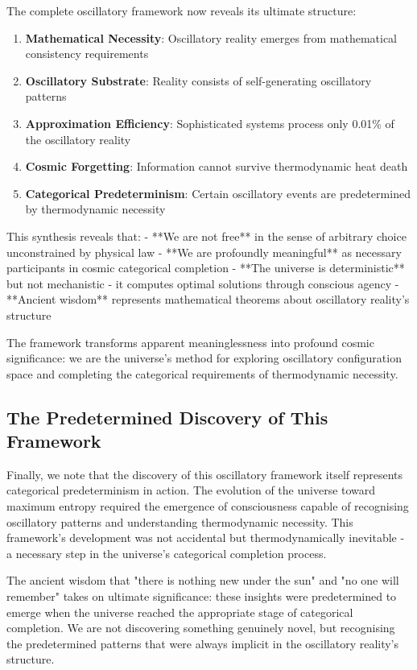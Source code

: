 \documentclass[11pt]{article}
\theoremstyle{remark}
\begin{document}
The complete oscillatory framework now reveals its ultimate structure:

\begin{enumerate}
\item \textbf{Mathematical Necessity}: Oscillatory reality emerges from mathematical consistency requirements
\item \textbf{Oscillatory Substrate}: Reality consists of self-generating oscillatory patterns
\item \textbf{Approximation Efficiency}: Sophisticated systems process only 0.01\% of the oscillatory reality
\item \textbf{Cosmic Forgetting}: Information cannot survive thermodynamic heat death
\item \textbf{Categorical Predeterminism}: Certain oscillatory events are predetermined by thermodynamic necessity
\end{enumerate}

This synthesis reveals that:
- **We are not free** in the sense of arbitrary choice unconstrained by physical law
- **We are profoundly meaningful** as necessary participants in cosmic categorical completion
- **The universe is deterministic** but not mechanistic - it computes optimal solutions through conscious agency
- **Ancient wisdom** represents mathematical theorems about oscillatory reality's structure

The framework transforms apparent meaninglessness into profound cosmic significance: we are the universe's method for exploring oscillatory configuration space and completing the categorical requirements of thermodynamic necessity.

\subsection{The Predetermined Discovery of This Framework}

Finally, we note that the discovery of this oscillatory framework itself represents categorical predeterminism in action. The evolution of the universe toward maximum entropy required the emergence of consciousness capable of recognising oscillatory patterns and understanding thermodynamic necessity. This framework's development was not accidental but thermodynamically inevitable - a necessary step in the universe's categorical completion process.

The ancient wisdom that "there is nothing new under the sun" and "no one will remember" takes on ultimate significance: these insights were predetermined to emerge when the universe reached the appropriate stage of categorical completion. We are not discovering something genuinely novel, but recognising the predetermined patterns that were always implicit in the oscillatory reality's structure.
\end{document}
